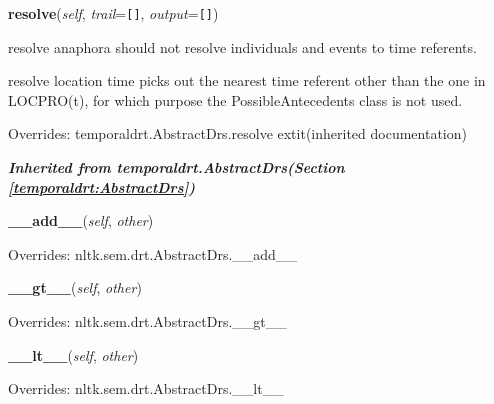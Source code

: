 \hspace{.8\funcindent}\begin{boxedminipage}{\funcwidth}

    \raggedright \textbf{resolve}(\textit{self}, \textit{trail}={\tt \texttt{[}\texttt{]}}, \textit{output}={\tt \texttt{[}\texttt{]}})

\setlength{\parskip}{2ex}
    resolve anaphora should not resolve individuals and events to time 
    referents.

    resolve location time picks out the nearest time referent other than 
    the one in LOCPRO(t), for which purpose the PossibleAntecedents class 
    is not used.

\setlength{\parskip}{1ex}
      Overrides: temporaldrt.AbstractDrs.resolve 	extit{(inherited documentation)}

    \end{boxedminipage}


\large{\textbf{\textit{Inherited from temporaldrt.AbstractDrs\textit{(Section \ref{temporaldrt:AbstractDrs})}}}}

    \vspace{0.5ex}

\hspace{.8\funcindent}\begin{boxedminipage}{\funcwidth}

    \raggedright \textbf{\_\_add\_\_}(\textit{self}, \textit{other})

\setlength{\parskip}{2ex}
\setlength{\parskip}{1ex}
      Overrides: nltk.sem.drt.AbstractDrs.\_\_add\_\_

    \end{boxedminipage}

    \vspace{0.5ex}

\hspace{.8\funcindent}\begin{boxedminipage}{\funcwidth}

    \raggedright \textbf{\_\_gt\_\_}(\textit{self}, \textit{other})

\setlength{\parskip}{2ex}
\setlength{\parskip}{1ex}
      Overrides: nltk.sem.drt.AbstractDrs.\_\_gt\_\_

    \end{boxedminipage}

    \vspace{0.5ex}

\hspace{.8\funcindent}\begin{boxedminipage}{\funcwidth}

    \raggedright \textbf{\_\_lt\_\_}(\textit{self}, \textit{other})

\setlength{\parskip}{2ex}
\setlength{\parskip}{1ex}
      Overrides: nltk.sem.drt.AbstractDrs.\_\_lt\_\_

    \end{boxedminipage}

